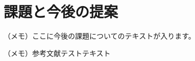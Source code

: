 \documentclass[platex,dvipdfmx]{jlreq}			%
\begin{document}
\section{課題と今後の提案}
（メモ）ここに今後の課題についてのテキストが入ります。

\begin{thebibliography}{99}

（メモ）参考文献テストテキスト

\end{thebibliography}
\end{document}
